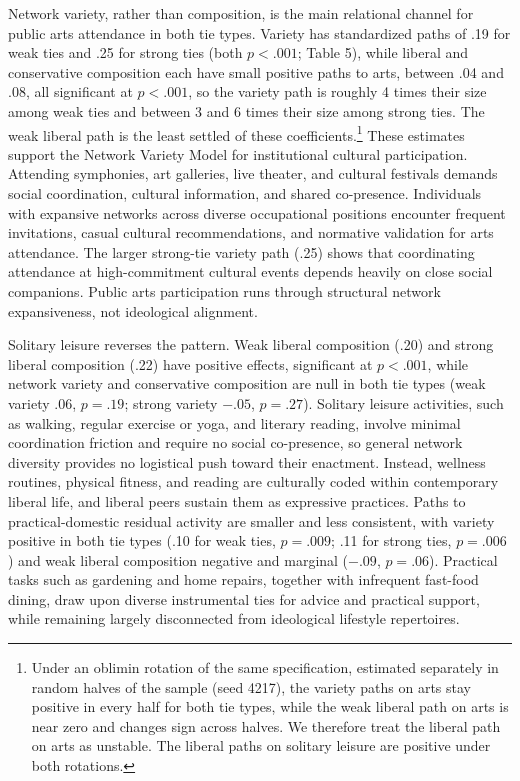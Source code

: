 \documentclass[
  12pt
]{article}
\begin{document}
Network variety, rather than composition, is the main relational channel for public arts attendance in both tie types. Variety has standardized paths of .19 for weak ties and .25 for strong ties (both $p < .001$; Table 5), while liberal and conservative composition each have small positive paths to arts, between .04 and .08, all significant at $p < .001$, so the variety path is roughly 4 times their size among weak ties and between 3 and 6 times their size among strong ties. The weak liberal path is the least settled of these coefficients.\footnote{Under an oblimin rotation of the same specification, estimated separately in random halves of the sample (seed 4217), the variety paths on arts stay positive in every half for both tie types, while the weak liberal path on arts is near zero and changes sign across halves. We therefore treat the liberal path on arts as unstable. The liberal paths on solitary leisure are positive under both rotations.} These estimates support the Network Variety Model for institutional cultural participation. Attending symphonies, art galleries, live theater, and cultural festivals demands social coordination, cultural information, and shared co-presence. Individuals with expansive networks across diverse occupational positions encounter frequent invitations, casual cultural recommendations, and normative validation for arts attendance. The larger strong-tie variety path (.25) shows that coordinating attendance at high-commitment cultural events depends heavily on close social companions. Public arts participation runs through structural network expansiveness, not ideological alignment.

Solitary leisure reverses the pattern. Weak liberal composition (.20) and strong liberal composition (.22) have positive effects, significant at $p < .001$, while network variety and conservative composition are null in both tie types (weak variety .06, $p = .19$; strong variety $-.05$, $p = .27$). Solitary leisure activities, such as walking, regular exercise or yoga, and literary reading, involve minimal coordination friction and require no social co-presence, so general network diversity provides no logistical push toward their enactment. Instead, wellness routines, physical fitness, and reading are culturally coded within contemporary liberal life, and liberal peers sustain them as expressive practices. Paths to practical-domestic residual activity are smaller and less consistent, with variety positive in both tie types (.10 for weak ties, $p = .009$; .11 for strong ties, $p = .006$) and weak liberal composition negative and marginal ($-.09$, $p = .06$). Practical tasks such as gardening and home repairs, together with infrequent fast-food dining, draw upon diverse instrumental ties for advice and practical support, while remaining largely disconnected from ideological lifestyle repertoires.
\end{document}
